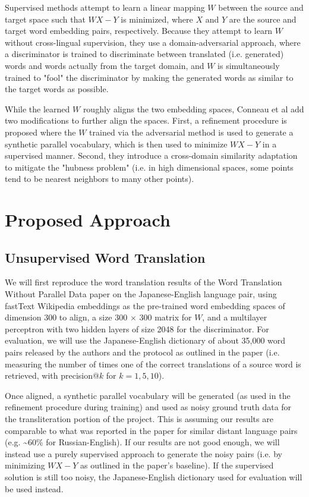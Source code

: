 \documentclass{article}
\begin{document}
Supervised methods attempt to learn a linear mapping $W$ between the source and target
space such that $WX-Y$ is minimized, where $X$ and $Y$ are the source and target word
embedding pairs, respectively. Because they attempt to learn $W$ without cross-lingual 
supervision, they use a domain-adversarial approach, where a discriminator is trained
to discriminate between translated (i.e. generated) words and words actually from the
target domain, and $W$ is simultaneously trained to "fool" the discriminator by making
the generated words as similar to the target words as possible.

While the learned $W$ roughly aligns the two embedding spaces, Conneau et al add two
modifications to further align the spaces. First, a refinement procedure is proposed
where the $W$ trained via the adversarial method is used to generate a synthetic
parallel vocabulary, which is then used to minimize $WX-Y$ in a supervised manner.
Second, they introduce a cross-domain similarity adaptation to mitigate the "hubness
problem" (i.e. in high dimensional spaces, some points tend to be nearest neighbors
to many other points).

\section*{Proposed Approach}

\subsection*{Unsupervised Word Translation}

We will first reproduce the word translation results of the Word Translation Without
Parallel Data paper on the Japanese-English language pair, using fastText Wikipedia
embeddings as the pre-trained word embedding spaces of dimension 300 to align,
a size 300 $\times$ 300 matrix for $W$, and a multilayer perceptron with two hidden
layers of size 2048 for the discriminator. For evaluation, we will use the
Japanese-English dictionary of about 35,000 word pairs released by the authors and
the protocol as outlined in the paper (i.e. measuring the number of times one of the
correct translations of a source word is retrieved, with precision@$k$ for $k = 1,5,10$).

Once aligned, a synthetic parallel vocabulary will be generated (as used in the
refinement procedure during training) and used as noisy ground truth data for
the transliteration portion of the project. This is assuming our results are comparable
to what was reported in the paper for similar distant language pairs
(e.g. \textasciitilde 60\% for Russian-English). If our results are not good enough,
we will instead use a purely supervised approach to generate the noisy pairs (i.e. by
minimizing $WX-Y$ as outlined in the paper's baseline). If the supervised solution is
still too noisy, the Japanese-English dictionary used for evaluation will be used instead.
\end{document}
